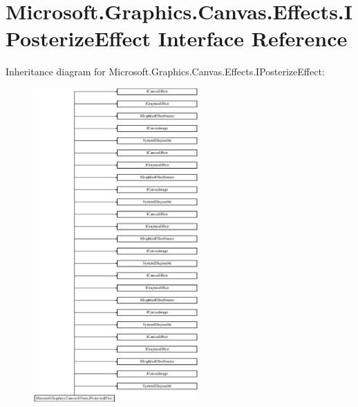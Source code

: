 \hypertarget{interface_microsoft_1_1_graphics_1_1_canvas_1_1_effects_1_1_i_posterize_effect}{}\section{Microsoft.\+Graphics.\+Canvas.\+Effects.\+I\+Posterize\+Effect Interface Reference}
\label{interface_microsoft_1_1_graphics_1_1_canvas_1_1_effects_1_1_i_posterize_effect}
Inheritance diagram for Microsoft.\+Graphics.\+Canvas.\+Effects.\+I\+Posterize\+Effect\+:\begin{figure}[H]
\begin{center}
\leavevmode
\includegraphics[height=12.000000cm]{interface_microsoft_1_1_graphics_1_1_canvas_1_1_effects_1_1_i_posterize_effect}
\end{center}
\end{figure}
